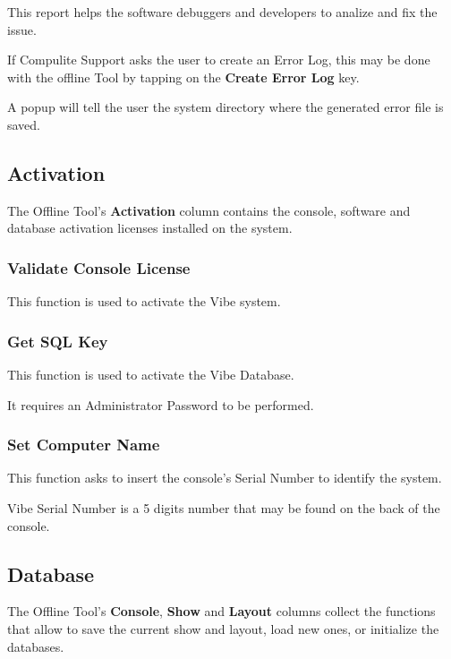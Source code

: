 \documentclass[
]{article}
\begin{document}
This report helps the software debuggers and developers to analize and fix the issue.

If Compulite Support asks the user to create an Error Log, this may be done with the offline Tool by tapping on the \textbf{Create Error Log} key.

A popup will tell the user the system directory where the generated error file is saved.

\hypertarget{activation}{%
\subsection{Activation}\label{activation}}

The Offline Tool's \textbf{Activation} column contains the console, software and database activation licenses installed on the system.

\hypertarget{validate-console-license}{%
\subsubsection{Validate Console License}\label{validate-console-license}}

This function is used to activate the Vibe system.

\hypertarget{get-sql-key}{%
\subsubsection{Get SQL Key}\label{get-sql-key}}

This function is used to activate the Vibe Database.

It requires an Administrator Password to be performed.

\hypertarget{set-computer-name}{%
\subsubsection{Set Computer Name}\label{set-computer-name}}

This function asks to insert the console's Serial Number to identify the system.

Vibe Serial Number is a 5 digits number that may be found on the back of the console.

\hypertarget{database}{%
\subsection{Database}\label{database}}

The Offline Tool's \textbf{Console}, \textbf{Show} and \textbf{Layout} columns collect the functions that allow to save the current show and layout, load new ones, or initialize the databases.
\end{document}
